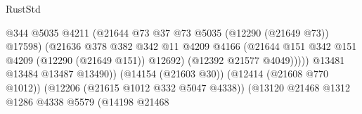 \begin{lexlean}{RustStd}
\begin{coremodule}
                                                          @344
                                                          @5035
                                                          @4211
                                                          (@21644
                                                            @73
                                                            @37
                                                            @73
                                                            @5035
                                                            (@12290 (@21649 @73))
                                                            @17598)
                                                          (@21636
                                                            @378
                                                            @382
                                                            @342
                                                            @11
                                                            @4209
                                                            @4166
                                                            (@21644
                                                              @151
                                                              @342
                                                              @151
                                                              @4209
                                                              (@12290 (@21649 @151))
                                                              @12692)
                                                            (@12392 @21577 @4049)))))
                                                    @13481
                                                    @13484
                                                    @13487
                                                    @13490))
                                                (@14154 (@21603 @30))
                                                (@12414 (@21608 @770 @1012))
                                                (@12206 (@21615 @1012 @332 @5047 @4338))
                                                (@13120
                                                  @21468
                                                  @1312
                                                  @1286
                                                  @4338
                                                  @5579
                                                  (@14198
                                                    @21468

\end{coremodule}
\end{lexlean}
